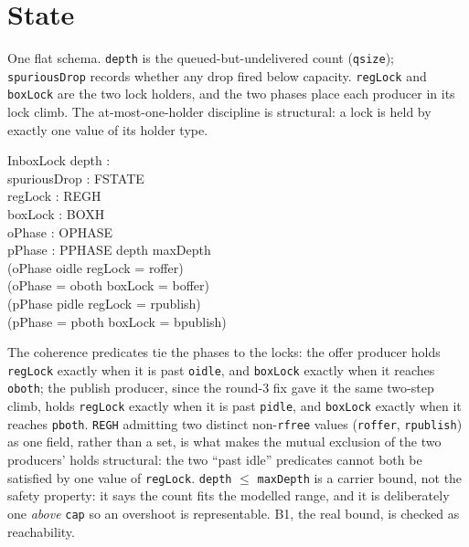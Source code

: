\documentclass[a4paper,10pt,fleqn]{article}
\begin{document}
\section{State}

One flat schema. \texttt{depth} is the queued-but-undelivered count
(\texttt{qsize}); \texttt{spuriousDrop} records whether any drop fired below
capacity. \texttt{regLock} and \texttt{boxLock} are the two lock holders, and the
two phases place each producer in its lock climb. The at-most-one-holder
discipline is structural: a lock is held by exactly one value of its holder type.

\begin{schema}{InboxLock}
  depth : \nat \\
  spuriousDrop : FSTATE \\
  regLock : REGH \\
  boxLock : BOXH \\
  oPhase : OPHASE \\
  pPhase : PPHASE
\where
  depth \leq maxDepth \\
  (oPhase \neq oidle \iff regLock = roffer) \\
  (oPhase = oboth \iff boxLock = boffer) \\
  (pPhase \neq pidle \iff regLock = rpublish) \\
  (pPhase = pboth \iff boxLock = bpublish)
\end{schema}

The coherence predicates tie the phases to the locks: the offer producer holds
\texttt{regLock} exactly when it is past \texttt{oidle}, and \texttt{boxLock}
exactly when it reaches \texttt{oboth}; the publish producer, since the
round-3 fix gave it the same two-step climb, holds \texttt{regLock} exactly
when it is past \texttt{pidle}, and \texttt{boxLock} exactly when it reaches
\texttt{pboth}. \texttt{REGH} admitting two distinct non-\texttt{rfree}
values (\texttt{roffer}, \texttt{rpublish}) as one field, rather than a set,
is what makes the mutual exclusion of the two producers' holds structural: the
two ``past idle'' predicates cannot both be satisfied by one value of
\texttt{regLock}. \texttt{depth} $\leq$ \texttt{maxDepth} is a carrier bound,
not the safety property: it says the count fits the modelled range, and it is
deliberately one \emph{above} \texttt{cap} so an overshoot is representable.
B1, the real bound, is checked as reachability.
\end{document}
